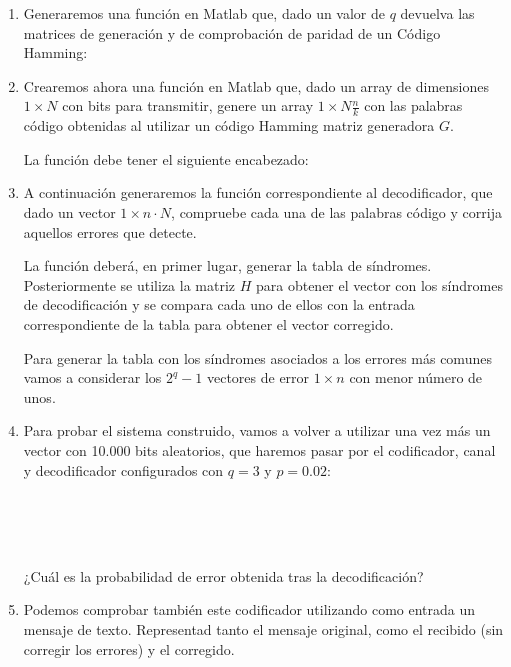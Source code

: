 \documentclass[es,practica]{uah}
\begin{document}
	\begin{enumerate}
	
		\item \textrm{Generaremos una función en Matlab que, dado un valor de $q$ devuelva las matrices de generación y de comprobación de paridad de un Código Hamming:}
		
		
	
		\item \textrm{Crearemos ahora una función en Matlab que, dado un array de dimensiones $1 \times N$ con bits para transmitir, genere un array $1 \times N \frac{n}{k}$ con las palabras código obtenidas al utilizar un código Hamming matriz generadora $G$.}
	
			\textrm{La función debe tener el siguiente encabezado:}
			
	
	
		\item \textrm{A continuación generaremos la función correspondiente al decodificador, que dado un vector $1 \times n\cdot N$, compruebe cada una de las palabras código y corrija aquellos errores que detecte.}
		
				
			\textrm{La función deberá, en primer lugar, generar la tabla de síndromes. Posteriormente se utiliza la matriz $H$ para obtener el vector con los síndromes de decodificación y se compara cada uno de ellos con la entrada correspondiente de la tabla para obtener el vector corregido.}
			
			\textrm{Para generar la tabla con los síndromes asociados a los errores más comunes vamos a considerar los $2^q-1$ vectores de error $1 \times n$ con menor número de unos.}
			
		\item \textrm{Para probar el sistema construido, vamos a volver a utilizar una vez más un vector con 10.000 bits aleatorios, que haremos pasar por el codificador, canal y decodificador configurados con $q=3$ y $p=0.02$:}
		
				\\
				\\
				\\
		
			\textrm{¿Cuál es la probabilidad de error obtenida tras la decodificación? }
			\item Podemos comprobar también este codificador utilizando como entrada un mensaje de texto. Representad tanto el mensaje original, como el recibido (sin corregir los errores) y el corregido. 
	\end{enumerate}
\end{document}
